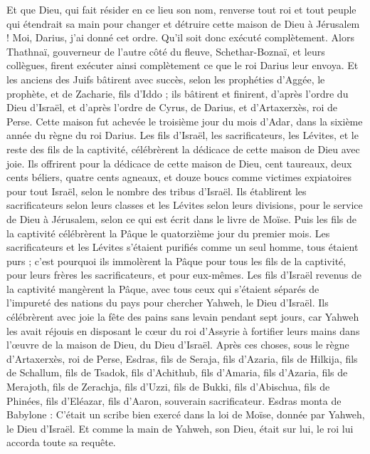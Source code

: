 \begin{multicols}{2}
Et que Dieu, qui fait résider en ce lieu son nom, renverse tout roi et tout peuple qui étendrait sa main pour changer et détruire cette maison de Dieu à Jérusalem ! Moi, Darius, j’ai donné cet ordre. Qu'il soit donc exécuté complètement.
Alors Thathnaï, gouverneur de l'autre côté du fleuve,  Schethar-Boznaï, et leurs collègues, firent exécuter ainsi complètement ce que le roi Darius leur envoya.
Et les anciens des Juifs bâtirent avec succès, selon les prophéties d'Aggée, le prophète, et de Zacharie, fils d’Iddo ; ils bâtirent et finirent, d'après l'ordre du Dieu d'Israël, et d'après l'ordre de Cyrus, de Darius, et d'Artaxerxès, roi de Perse.
Cette maison fut achevée le troisième jour du mois d'Adar, dans la sixième année du règne du roi Darius.
Les fils d'Israël, les sacrificateurs, les Lévites, et le reste des fils de la captivité, célébrèrent la dédicace de cette maison de Dieu avec joie.
Ils offrirent pour la dédicace de cette maison de Dieu, cent taureaux, deux cents béliers, quatre cents agneaux, et douze boucs comme victimes expiatoires pour tout Israël, selon le nombre des tribus d'Israël.
Ils établirent les sacrificateurs selon leurs classes et les Lévites selon leurs divisions, pour le service de Dieu à Jérusalem,  selon ce qui est écrit dans le livre de Moïse.
Puis les fils de la captivité célébrèrent la Pâque le quatorzième jour du premier mois.
Les sacrificateurs et les Lévites s'étaient purifiés comme un seul homme, tous étaient purs ; c'est pourquoi ils immolèrent la Pâque pour tous les fils de la captivité, pour leurs frères les sacrificateurs, et pour eux-mêmes.
Les fils d'Israël revenus de la captivité mangèrent la Pâque, avec tous ceux qui s'étaient séparés de l’impureté des nations du pays pour chercher Yahweh, le Dieu d'Israël.
Ils célébrèrent avec joie la fête des pains sans levain pendant sept jours, car Yahweh les avait réjouis en disposant  le cœur du roi d'Assyrie à fortifier leurs mains dans l’œuvre de la maison de Dieu, du Dieu d'Israël.
\VerseOne{}Après ces choses, sous le règne d'Artaxerxès, roi de Perse, Esdras, fils de Seraja, fils d'Azaria, fils de Hilkija,
fils de Schallum, fils de Tsadok, fils d'Achithub,
fils d'Amaria, fils d'Azaria, fils de Merajoth,
fils de Zerachja, fils d'Uzzi, fils de Bukki,
fils d'Abischua, fils de Phinées, fils d'Eléazar, fils d'Aaron, souverain sacrificateur.
Esdras monta de Babylone : C’était un scribe bien exercé dans la loi de Moïse, donnée par Yahweh, le Dieu d'Israël. Et comme la main de Yahweh, son Dieu, était sur lui, le roi lui accorda toute sa requête.

\end{multicols}
